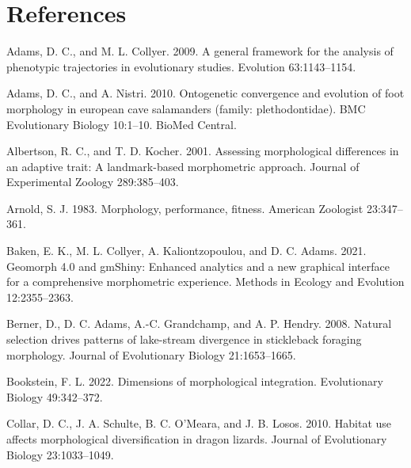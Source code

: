 \documentclass[
  11pt,
]{article}
\newlength{\cslhangindent}
\newlength{\cslentryspacingunit} %
\newenvironment{CSLReferences}[2] %
 {%
  \setlength{\parindent}{0pt}
  \ifodd #1
  \let\oldpar\par
  \def\par{\hangindent=\cslhangindent\oldpar}
  \fi
  \setlength{\parskip}{#2\cslentryspacingunit}
 }%
 {}
\begin{document}
\newpage

\hypertarget{references}{%
\section*{References}\label{references}}

\setlength{\parindent}{-0.25in} \setlength{\leftskip}{0.25in}
\setlength{\parskip}{8pt} \noindent

\hypertarget{refs}{}
\begin{CSLReferences}{1}{0}
\leavevmode{}%
Adams, D. C., and M. L. Collyer. 2009. A general framework for the
analysis of phenotypic trajectories in evolutionary studies. Evolution
63:1143--1154.

\leavevmode{}%
Adams, D. C., and A. Nistri. 2010. Ontogenetic convergence and evolution
of foot morphology in european cave salamanders (family:
plethodontidae). BMC Evolutionary Biology 10:1--10. BioMed Central.

\leavevmode{}%
Albertson, R. C., and T. D. Kocher. 2001. Assessing morphological
differences in an adaptive trait: A landmark-based morphometric
approach. Journal of Experimental Zoology 289:385--403.

\leavevmode{}%
Arnold, S. J. 1983. Morphology, performance, fitness. American Zoologist
23:347--361.

\leavevmode{}%
Baken, E. K., M. L. Collyer, A. Kaliontzopoulou, and D. C. Adams. 2021.
Geomorph 4.0 and gmShiny: Enhanced analytics and a new graphical
interface for a comprehensive morphometric experience. Methods in
Ecology and Evolution 12:2355--2363.

\leavevmode{}%
Berner, D., D. C. Adams, A.-C. Grandchamp, and A. P. Hendry. 2008.
Natural selection drives patterns of lake-stream divergence in
stickleback foraging morphology. Journal of Evolutionary Biology
21:1653--1665.

\leavevmode{}%
Bookstein, F. L. 2022. Dimensions of morphological integration.
Evolutionary Biology 49:342--372.

\leavevmode{}%
Collar, D. C., J. A. Schulte, B. C. O'Meara, and J. B. Losos. 2010.
Habitat use affects morphological diversification in dragon lizards.
Journal of Evolutionary Biology 23:1033--1049.


\end{CSLReferences}
\end{document}
